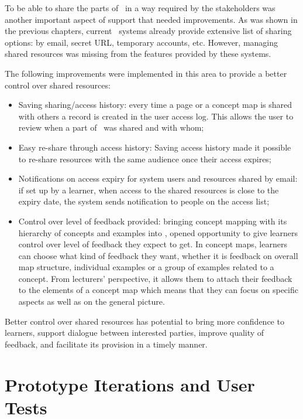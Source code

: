 To be able to share the parts of \ep~in a way required by the stakeholders was
another important aspect of \LLLs support that needed improvements. As was shown
in the previous chapters, current \ep~systems already provide extensive list of
sharing options: by email, secret URL, temporary accounts, etc. However,
managing shared resources was missing from the features provided by these systems.

The following improvements were implemented in this area to provide a better
control over shared resources:

\begin{itemize}
  \item Saving sharing/access history: every time a page or a concept map is
  shared with others a record is created in the user access log. This allows the
  user to review when a part of \ep~was shared and with whom; 
  \item Easy re-share through access history: Saving access history made it
  possible to re-share resources with the same audience once their access
  expires;
  \item Notifications on access expiry for system users and resources shared by
  email: if set up by a learner, when access to the shared resources is close to
  the expiry date, the system sends notification to people on the access list;
  \item Control over level of feedback provided: bringing concept mapping with
  its hierarchy of concepts and examples into \ep, opened opportunity to give
  learners control over level of feedback they expect to get. In concept maps,
  learners can choose what kind of feedback they want, whether it is feedback on
  overall map structure, individual examples or a group of examples related to a
  concept. From lecturers' perspective, it allows them to attach their feedback
  to the elements of a concept map which means that they can focus on specific
  aspects as well as on the general picture.
\end{itemize}

Better control over shared resources has potential to bring more confidence to
learners, support dialogue between interested parties, improve quality of
feedback, and facilitate its provision in a timely manner.

\section{Prototype Iterations and User Tests}
 
